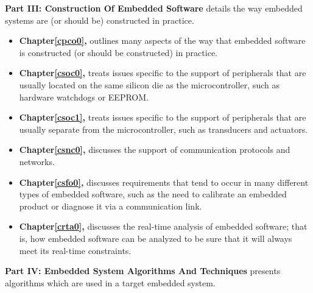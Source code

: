 \textbf{Part III:  Construction Of Embedded Software}
details the way embedded systems are (or should be)
constructed in practice.
\begin{itemize}
\item \textbf{Chapter\;\ref{cpco0}, \cpcozerotitle{}} outlines many aspects of
      the way that embedded software is constructed (or should be constructed) 
      in practice.

\item \textbf{Chapter\;\ref{csoc0}, \csoczerotitle{}} treats issues specific to 
      the support of peripherals that are usually located on the same silicon
      die as the microcontroller, such as hardware watchdogs or EEPROM.

\item \textbf{Chapter\;\ref{csoc1}, \csoconetitle{}} treats issues specific to 
      the support of peripherals that are usually separate from the microcontroller,
      such as transducers and actuators.

\item \textbf{Chapter\;\ref{csnc0}, \csnczerotitle{}} discusses the support
      of communication protocols and networks.

\item \textbf{Chapter\;\ref{csfo0}, \csfozerotitle{}} discusses requirements
      that tend to occur in many different types of embedded software,
      such as the need to calibrate an embedded product or diagnose it
      via a communication link.

\item \textbf{Chapter\;\ref{crta0}, \crtazerotitle{}} discusses the real-time
      analysis of embedded software; that is, how embedded software can be
      analyzed to be sure that it will always meet its real-time constraints.
\end{itemize}


\textbf{Part IV:  Embedded System Algorithms And Techniques}
presents algorithms which are used in a target embedded system.

